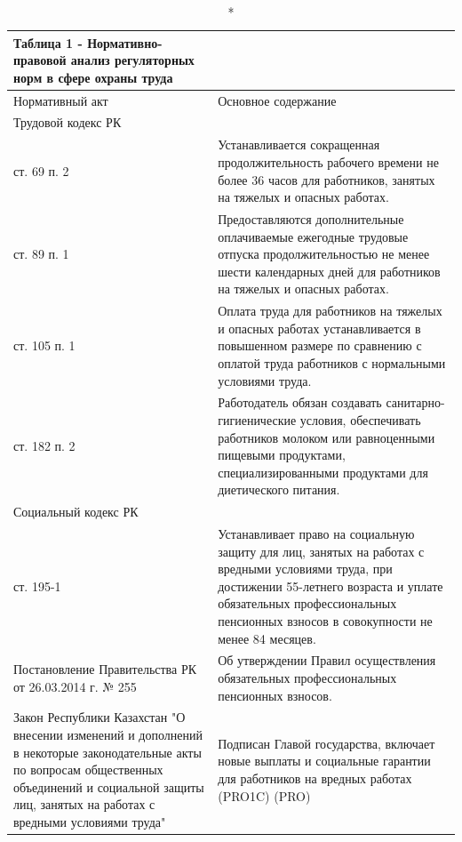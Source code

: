 \begin{longtable}[c]{|lp{}|}
\caption*{Таблица 1 - Нормативно-правовой анализ регуляторных норм в сфере охраны труда} \\
\hline
\multicolumn{1}{|l|}{Нормативный акт} &
  Основное содержание \\ \hline
\endfirsthead
%
\endhead
%
\multicolumn{2}{|p{0.4\textwidth}|}{Трудовой кодекс РК} \\ \hline
\multicolumn{1}{|p{0.4\textwidth}|}{ст. 69 п. 2} &
  Устанавливается сокращенная продолжительность рабочего времени не более 36 часов для работников, занятых на тяжелых и опасных работах. \\ \hline
\multicolumn{1}{|p{0.4\textwidth}|}{ст. 89 п. 1} &
  Предоставляются дополнительные оплачиваемые ежегодные трудовые отпуска продолжительностью не менее шести календарных дней для работников на тяжелых и опасных работах. \\ \hline
\multicolumn{1}{|p{0.4\textwidth}|}{ст. 105 п. 1} &
  Оплата труда для работников на тяжелых и опасных работах устанавливается в повышенном размере по сравнению с оплатой труда работников с нормальными условиями труда. \\ \hline
\multicolumn{1}{|p{0.4\textwidth}|}{ст. 182 п. 2} &
  Работодатель обязан создавать санитарно-гигиенические условия, обеспечивать работников молоком или равноценными пищевыми продуктами, специализированными продуктами для диетического питания. \\ \hline
\multicolumn{2}{|p{0.4\textwidth}|}{Социальный кодекс РК} \\ \hline
\multicolumn{1}{|p{0.4\textwidth}|}{ст. 195-1} &
  Устанавливает право на социальную защиту для лиц, занятых на работах с вредными условиями труда, при достижении 55-летнего возраста и уплате обязательных профессиональных пенсионных взносов в совокупности не менее 84 месяцев. \\ \hline
\multicolumn{1}{|p{0.4\textwidth}|}{Постановление Правительства РК от 26.03.2014 г. № 255} &
  Об утверждении Правил осуществления обязательных профессиональных пенсионных взносов. \\ \hline
\multicolumn{1}{|p{0.4\textwidth}|}{Закон Республики Казахстан "О внесении изменений и дополнений в некоторые законодательные акты по вопросам общественных объединений и социальной защиты лиц, занятых на работах с вредными условиями труда"} &
  Подписан Главой государства, включает новые выплаты и социальные гарантии для работников на вредных работах (PRO1C) (PRO) \\ \hline

\end{longtable}
